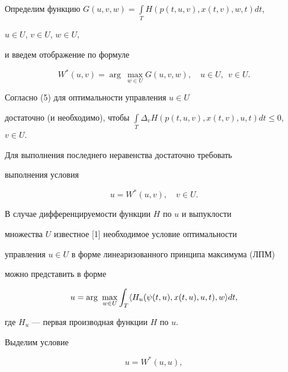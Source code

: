 Определим функцию $G(u,v,w)=\int\limits_T H(p(t,u,v),x(t,v),w,t)d t$, 


$u\in U$, $v\in U$, $w\in U$, 


и введем отображение по формуле 


\begin{equation} 


W^*(u,v)=\arg\ \max_{w\in U}G(u,v,w),\quad u\in U,\ \ v\in U. 


\end{equation} 


 


Согласно (5) для оптимальности управления $u\in U$ 


достаточно (и необходимо), чтобы $\int\limits_T \Delta_v 


H(p(t,u,v),x(t,v),u,t)d t\le0$, $v\in U$. 


Для выполнения последнего неравенства достаточно требовать 


выполнения условия 


\begin{equation} 


u=W^*(u,v),\quad v\in U. 


\end{equation} 


 


В случае дифференцируемости функции $H$ по $u$ и выпуклости 


множества $U$ известное [1] необходимое условие оптимальности 


управления $u\in U$ в форме линеаризованного принципа максимума (ЛПМ) 


можно представить в форме 


\begin{equation} 


u=\arg\ \max_{w\in U}\int_T\la H_u(\psi(t,u),x(t,u),u,t),w\ra d t, 


\end{equation} 


где $H_u$ --- первая производная функции $H$ по $u$. 


 


Выделим условие 


\begin{equation} 


u=W^*(u,u), 


\end{equation} 


